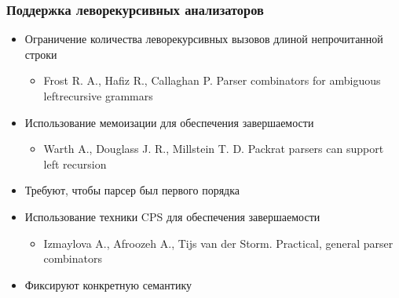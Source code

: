 \documentclass{beamer}
\begin{document}
\begin{frame}[fragile]
  \transwipe[direction=90]
  \frametitle{Поддержка леворекурсивных анализаторов}
  \begin{itemize} %
    \item Ограничение количества леворекурсивных вызовов длиной непрочитанной строки
    \begin{itemize}
      \item Frost R. A., Hafiz R., Callaghan P. Parser combinators for ambiguous leftrecursive grammars
    \end{itemize}
    \item Использование мемоизации для обеспечения завершаемости
    \begin{itemize}
      \item Warth A., Douglass J. R., Millstein T. D. Packrat parsers can support left recursion
    \end{itemize}

    \item Требуют, чтобы парсер был первого порядка
  \end{itemize}

  \begin{itemize}
    \item Использование техники CPS для обеспечения завершаемости
    \begin{itemize}
      \item Izmaylova	A., Afroozeh A., Tijs van der Storm. 
Practical, general parser combinators
    \end{itemize}

    \item Фиксируют конкретную семантику
  \end{itemize}  

\end{frame}


\end{document}
